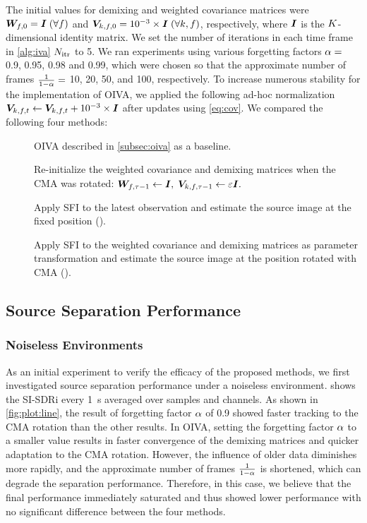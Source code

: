 \documentclass[sip,biber]{now-journal}
\begin{document}
The initial values for demixing and weighted covariance matrices were
$\bm{W} _{f,0} = \bm{I}\; (\forall f)$ and $\bm{V} _{k,f,0} = 10^{-3} \times \bm{I}\; (\forall k, f)$, respectively, where $\bm{I}$ is the $K$-dimensional identity matrix.
We set the number of iterations in each time frame in \cref{alg:iva} $N _{\mathrm{itr}}$ to 5.
We ran experiments using various forgetting factors $\alpha = $ 0.9, 0.95, 0.98 and 0.99,
which were chosen so that the approximate number of frames $\frac{1}{1 - \alpha} =$ 10, 20, 50, and 100, respectively.
To increase numerous stability for the implementation of OIVA,
we applied the following ad-hoc normalization $\cov _{\src,\ft} \gets \cov _{\src,\ft} + 10 ^{-3} \times \Eye$ after updates using \eqref{eq:cov}.
We compared the following four methods:
\begin{description}
  \item[\NaiveIVA] OIVA described in \cref{subsec:oiva} as a baseline.
  \item[\ResetIVA] Re-initialize the weighted covariance and demixing matrices when the CMA was rotated:
      $\bm{W} _{f,\tau - 1} \gets \bm{I}, \; \bm{V} _{k,f,\tau - 1} \gets \varepsilon \bm{I}.$
  \item[\SFIIVAo] Apply SFI to the latest observation and estimate the source image at the fixed position ().
  \item[\SFIIVAm] Apply SFI to the weighted covariance and demixing matrices as parameter transformation and estimate the source image at the position rotated with CMA ().
\end{description}

\subsection{Source Separation Performance}
\subsubsection{Noiseless Environments}

As an initial experiment to verify the efficacy of the proposed methods, we first investigated source separation performance under a noiseless environment.
 shows the SI-SDRi every \SI{1}{\second} averaged over samples and channels.
As shown in \cref{fig:plot:line}, the result of forgetting factor $\alpha$ of 0.9 showed faster tracking to the CMA rotation than the other results.
In OIVA, setting the forgetting factor $\alpha$ to a smaller value results in faster convergence of the demixing matrices and quicker adaptation to the CMA rotation.
However, the influence of older data diminishes more rapidly, and the approximate number of frames $\frac{1}{1 - \alpha}$ is shortened, which can degrade the separation performance.
Therefore, in this case, we believe that the final performance immediately saturated and thus showed lower performance with no significant difference between the four methods.
\end{document}
